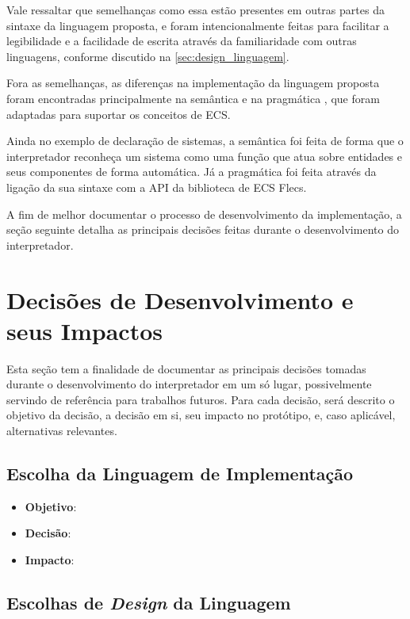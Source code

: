 Vale ressaltar que semelhanças como essa estão presentes em outras partes da sintaxe da linguagem proposta, e foram intencionalmente feitas para facilitar a legibilidade e a facilidade de escrita através da familiaridade com outras linguagens, conforme discutido na \autoref{sec:design_linguagem}.

Fora as semelhanças, as diferenças na implementação da linguagem proposta foram encontradas principalmente na semântica e na pragmática \cite{designconceptsinlanguages}, que foram adaptadas para suportar os conceitos de ECS.

Ainda no exemplo de declaração de sistemas, a semântica foi feita de forma que o interpretador reconheça um sistema como uma função que atua sobre entidades e seus componentes de forma automática. Já a pragmática foi feita através da ligação da sua sintaxe com a API da biblioteca de ECS Flecs.

A fim de melhor documentar o processo de desenvolvimento da implementação, a seção seguinte detalha as principais decisões feitas durante o desenvolvimento do interpretador.

\section{Decisões de Desenvolvimento e seus Impactos}

Esta seção tem a finalidade de documentar as principais decisões tomadas durante o desenvolvimento do interpretador em um só lugar, possivelmente servindo de referência para trabalhos futuros. Para cada decisão, será descrito o objetivo da decisão, a decisão em si, seu impacto no protótipo, e, caso aplicável, alternativas relevantes.

\subsection{Escolha da Linguagem de Implementação}

\begin{itemize}
	\item \textbf{Objetivo}:
	\item \textbf{Decisão}:
	\item \textbf{Impacto}:
\end{itemize}

\subsection{Escolhas de \textit{Design} da Linguagem}

